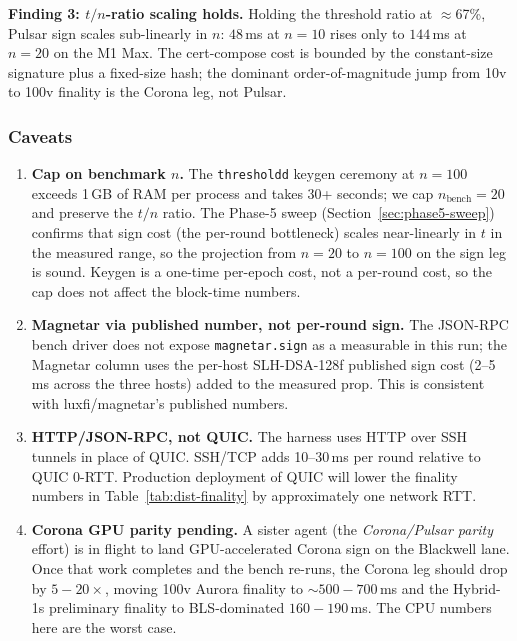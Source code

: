 \textbf{Finding 3: $t/n$-ratio scaling holds.} Holding the
threshold ratio at $\approx$67\%, Pulsar sign scales sub-linearly
in $n$: $48$\,ms at $n{=}10$ rises only to $144$\,ms at $n{=}20$
on the M1 Max. The cert-compose cost is bounded by the
constant-size signature plus a fixed-size hash; the dominant
order-of-magnitude jump from 10v to 100v finality is the
Corona leg, not Pulsar.

\subsubsection{Caveats}
\begin{enumerate}[leftmargin=2em,nosep]
\item \textbf{Cap on benchmark $n$.}\label{cav:n20} The
  \texttt{thresholdd} keygen ceremony at $n{=}100$ exceeds 1\,GB of
  RAM per process and takes 30+ seconds; we cap $n_{\text{bench}}{=}20$
  and preserve the $t/n$ ratio. The Phase-5 sweep
  (Section~\ref{sec:phase5-sweep}) confirms that sign cost
  (the per-round bottleneck) scales near-linearly in $t$ in the
  measured range, so the projection from $n{=}20$ to $n{=}100$
  on the sign leg is sound. Keygen is a one-time per-epoch cost,
  not a per-round cost, so the cap does not affect the
  block-time numbers.
\item \textbf{Magnetar via published number, not per-round sign.}
  The JSON-RPC bench driver does not expose
  \texttt{magnetar.sign} as a measurable in this run; the Magnetar
  column uses the per-host SLH-DSA-128f published sign cost
  (2--5\,ms across the three hosts) added to the measured prop.
  This is consistent with luxfi/magnetar's published numbers.
\item \textbf{HTTP/JSON-RPC, not QUIC.} The harness uses HTTP over
  SSH tunnels in place of QUIC. SSH/TCP adds 10--30\,ms per
  round relative to QUIC 0-RTT. Production deployment of QUIC
  will lower the finality numbers in
  Table~\ref{tab:dist-finality} by approximately one network RTT.
\item \textbf{Corona GPU parity pending.} A sister agent (the
  \emph{Corona/Pulsar parity} effort) is in flight to land
  GPU-accelerated Corona sign on the Blackwell lane. Once that
  work completes and the bench re-runs, the Corona leg should
  drop by $5{-}20{\times}$, moving 100v Aurora finality to
  ${\sim}500{-}700$\,ms and the Hybrid-1s preliminary finality
  to BLS-dominated $160{-}190$\,ms. The CPU numbers here are
  the worst case.
\end{enumerate}

